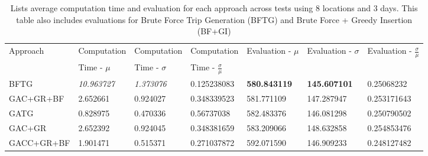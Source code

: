 \begin{table}[H]
    \centering
    \caption{Lists average computation time and evaluation for each approach across tests using 8 locations and 3 days. This table also includes evaluations for Brute Force Trip Generation (BFTG) and Brute Force + Greedy Insertion (BF+GI)}\label{tab:averages-8-locations-3-days}
    \scriptsize
    \begin{tabular}{lllllll}
        Approach   & Computation  & Computation & Computation & Evaluation - $\mu$ & Evaluation - $\sigma$ & Evaluation - $\frac{\sigma}{\mu}$ \\
                   & Time - $\mu$ & Time - $\sigma$ & Time - $\frac{\sigma}{\mu}$ & & & \\
        BFTG       & \textit{10.963727}                                                  & \textit{1.373076}                                                     & 0.125238083                                                                        & \textbf{580.843119} & \textbf{145.607101}   & 0.25068232                        \\
        GAC+GR+BF  & 2.652661                                                            & 0.924027                                                              & 0.348339523                                                                        & 581.771109          & 147.287947            & 0.253171643                       \\
        GATG       & 0.828975                                                            & 0.470336                                                              & 0.56737038                                                                         & 582.483376          & 146.081298            & 0.250790502                       \\
        GAC+GR     & 2.652392                                                            & 0.924045                                                              & 0.348381659                                                                        & 583.209066          & 148.632858            & 0.254853476                       \\
        GACC+GR+BF & 1.901471                                                            & 0.515371                                                              & 0.271037872                                                                        & 592.071590          & 146.909233            & 0.248127482                       \\

\end{tabular}
\end{table}

